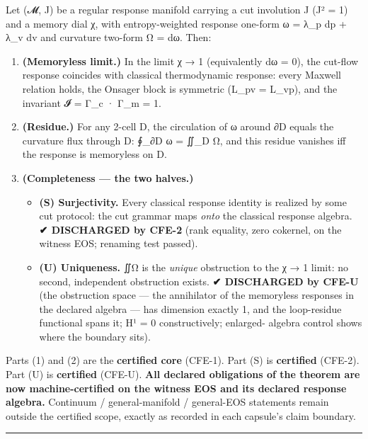Let (𝓜, J) be a regular response manifold carrying a cut involution
J (J² = 1) and a memory dial χ, with entropy-weighted response
one-form ω = λ\_p dp + λ\_v dv and curvature two-form Ω = dω. Then:

\begin{enumerate}
\def\labelenumi{\arabic{enumi}.}
\item
  \textbf{(Memoryless limit.)} In the limit χ → 1 (equivalently dω = 0), the
  cut-flow response coincides with classical thermodynamic response:
  every Maxwell relation holds, the Onsager block is symmetric
  (L\_pv = L\_vp), and the invariant 𝓘 = Γ\_c · Γ\_m = 1.
\item
  \textbf{(Residue.)} For any 2-cell D, the circulation of ω around ∂D
  equals the curvature flux through D: ∮\_∂D ω = ∬\_D Ω, and this residue
  vanishes iff the response is memoryless on D.
\item
  \textbf{(Completeness --- the two halves.)}

  \begin{itemize}
  \tightlist
  \item
    \textbf{(S) Surjectivity.} Every classical response identity is realized
    by some cut protocol: the cut grammar maps \emph{onto} the classical
    response algebra. \textbf{✔ DISCHARGED by CFE-2} (rank equality, zero
    cokernel, on the witness EOS; renaming test passed).
  \item
    \textbf{(U) Uniqueness.} ∬Ω is the \emph{unique} obstruction to the χ → 1
    limit: no second, independent obstruction exists. \textbf{✔ DISCHARGED by
    CFE-U} (the obstruction space --- the annihilator of the memoryless
    responses in the declared algebra --- has dimension exactly 1, and the
    loop-residue functional spans it; H¹ = 0 constructively; enlarged-
    algebra control shows where the boundary sits).
  \end{itemize}
\end{enumerate}

Parts (1) and (2) are the \textbf{certified core} (CFE-1). Part (S) is
\textbf{certified} (CFE-2). Part (U) is \textbf{certified} (CFE-U). \textbf{All declared
obligations of the theorem are now machine-certified on the witness EOS
and its declared response algebra.} Continuum / general-manifold /
general-EOS statements remain outside the certified scope, exactly as
recorded in each capsule's claim boundary.

\begin{center}\rule{0.5\linewidth}{0.5pt}\end{center}


